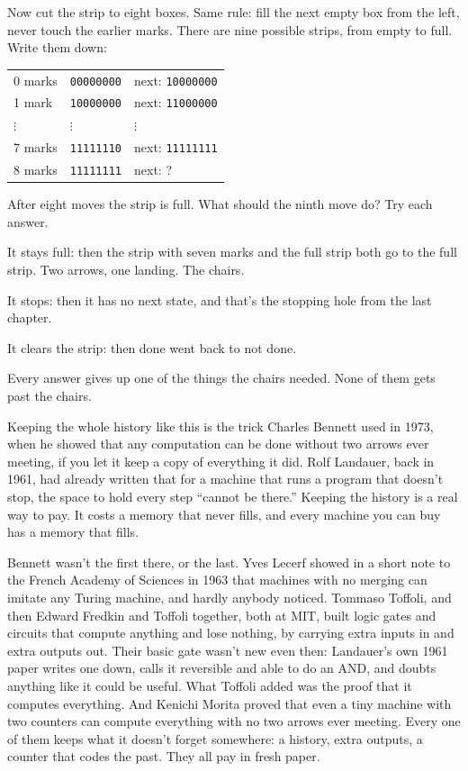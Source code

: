 \documentclass[11pt,twoside]{article}
\theoremstyle{thielethm}
\theoremstyle{thieledef}
\theoremstyle{thieledef}
\theoremstyle{thieledef}
\theoremstyle{thielethm}
\theoremstyle{thieleobs}
\theoremstyle{thielethm}
\begin{document}
Now cut the strip to eight boxes. Same rule: fill the next empty box from the left, never touch the earlier marks. There are nine possible strips, from empty to full. Write them down:

\begin{center}
\small
\begin{tabular}{@{}lll@{}}
0 marks & \texttt{00000000} & next: \texttt{10000000}\\
1 mark & \texttt{10000000} & next: \texttt{11000000}\\
$\vdots$ & $\vdots$ & $\vdots$\\
7 marks & \texttt{11111110} & next: \texttt{11111111}\\
8 marks & \texttt{11111111} & next: ?
\end{tabular}
\end{center}

After eight moves the strip is full. What should the ninth move do? Try each answer.

It stays full: then the strip with seven marks and the full strip both go to the full strip. Two arrows, one landing. The chairs.

It stops: then it has no next state, and that's the stopping hole from the last chapter.

It clears the strip: then done went back to not done.

Every answer gives up one of the things the chairs needed. None of them gets past the chairs.

Keeping the whole history like this is the trick Charles Bennett used in 1973, when he showed that any computation can be done without two arrows ever meeting, if you let it keep a copy of everything it did. Rolf Landauer, back in 1961, had already written that for a machine that runs a program that doesn't stop, the space to hold every step ``cannot be there.'' Keeping the history is a real way to pay. It costs a memory that never fills, and every machine you can buy has a memory that fills.

Bennett wasn't the first there, or the last. Yves Lecerf showed in a short note to the French Academy of Sciences in 1963 that machines with no merging can imitate any Turing machine, and hardly anybody noticed. Tommaso Toffoli, and then Edward Fredkin and Toffoli together, both at MIT, built logic gates and circuits that compute anything and lose nothing, by carrying extra inputs in and extra outputs out. Their basic gate wasn't new even then: Landauer's own 1961 paper writes one down, calls it reversible and able to do an AND, and doubts anything like it could be useful. What Toffoli added was the proof that it computes everything. And Kenichi Morita proved that even a tiny machine with two counters can compute everything with no two arrows ever meeting. Every one of them keeps what it doesn't forget somewhere: a history, extra outputs, a counter that codes the past. They all pay in fresh paper.
\end{document}
